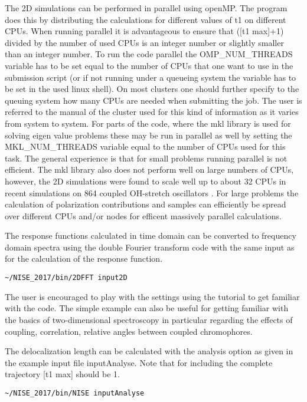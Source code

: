 The 2D simulations can be performed in parallel using openMP. The program does this by distributing the calculations for different values of t1 on different CPUs. When running parallel it is advantageous to ensure that ([t1 max]+1) divided by the number of used CPUs is an integer number or slightly smaller than an integer number. To run the code parallel the OMP\_NUM\_THREADS variable has to be set equal to the number of CPUs that one want to use in the submission script (or if not running under a queueing system the variable has to be set in the used linux shell). On most clusters one should further specify to the queuing system how many CPUs are needed when submitting the job. The user is referred to the manual of the cluster used for this kind of information as it varies from system to system. For parts of the code, where the mkl library is used for solving eigen value problems these may be run in parallel as well by setting the MKL\_NUM\_THREADS variable equal to the number of CPUs used for this task. The general experience is that for small problems running parallel is not efficient. The mkl library also does not perform well on large numbers of CPUs, however, the 2D simulations were found to scale well up to about 32 CPUs in recent simulations on 864 coupled OH-stretch oscillators \cite{Shi.2016.PCCP}. For large problems the calculation of polarization contributions and samples can efficiently be spread over different CPUs and/or nodes for efficent massively parallel calculations.

The response functions calculated in time domain can be converted to frequency domain spectra using the double Fourier transform code with the same input as for the calculation of the response function.
\begin{verbatim}
~/NISE_2017/bin/2DFFT input2D
\end{verbatim}

The user is encouraged to play with the settings using the tutorial to get familiar with the code.
The simple example can also be useful for getting familiar with the basics of two-dimensional spectroscopy in particular regarding the effects of coupling, correlation, relative angles between
coupled chromophores.

The delocalization length \cite{Thouless.1974.PR.13.93} can be calculated with the analysis option as given in 
the example input file inputAnalyse. Note that for including the complete trajectory [t1 
max] should be 1. 
\begin{verbatim}
~/NISE_2017/bin/NISE inputAnalyse 
\end{verbatim}

